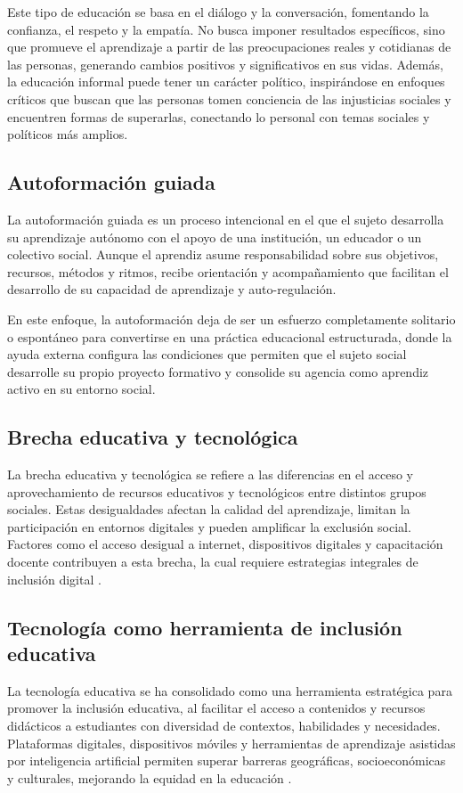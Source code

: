 Este tipo de educación se basa en el diálogo y la conversación, fomentando la
confianza, el respeto y la empatía. No busca imponer resultados específicos,
sino que promueve el aprendizaje a partir de las preocupaciones reales y
cotidianas de las personas, generando cambios positivos y significativos en sus
vidas. Además, la educación informal puede tener un carácter político,
inspirándose en enfoques críticos que buscan que las personas tomen conciencia
de las injusticias sociales y encuentren formas de superarlas, conectando lo
personal con temas sociales y políticos más amplios. \cite{mills2014informal}

\subsection{Autoformación guiada}
La autoformación guiada es un proceso intencional en el que el sujeto
desarrolla su aprendizaje autónomo con el apoyo de una institución, un educador
o un colectivo social. Aunque el aprendiz asume responsabilidad sobre sus
objetivos, recursos, métodos y ritmos, recibe orientación y acompañamiento que
facilitan el desarrollo de su capacidad de aprendizaje y auto-regulación.
\cite{Dumazedier1998}

En este enfoque, la autoformación deja de ser un esfuerzo completamente
solitario o espontáneo para convertirse en una práctica educacional
estructurada, donde la ayuda externa configura las condiciones que permiten que
el sujeto social desarrolle su propio proyecto formativo y consolide su agencia
como aprendiz activo en su entorno social. \cite{Dumazedier1998}

\subsection{Brecha educativa y tecnológica}
La brecha educativa y tecnológica se refiere a las diferencias en el acceso y
aprovechamiento de recursos educativos y tecnológicos entre distintos grupos
sociales. Estas desigualdades afectan la calidad del aprendizaje, limitan la
participación en entornos digitales y pueden amplificar la exclusión social.
Factores como el acceso desigual a internet, dispositivos digitales y
capacitación docente contribuyen a esta brecha, la cual requiere estrategias
integrales de inclusión digital \cite{van2005digital, warschauer2011learning}.

\subsection{Tecnología como herramienta de inclusión educativa}
La tecnología educativa se ha consolidado como una herramienta estratégica para
promover la inclusión educativa, al facilitar el acceso a contenidos y recursos
didácticos a estudiantes con diversidad de contextos, habilidades y
necesidades. Plataformas digitales, dispositivos móviles y herramientas de
aprendizaje asistidas por inteligencia artificial permiten superar barreras
geográficas, socioeconómicas y culturales, mejorando la equidad en la educación
\cite{selwyn2016education, unicef2019digital}.

